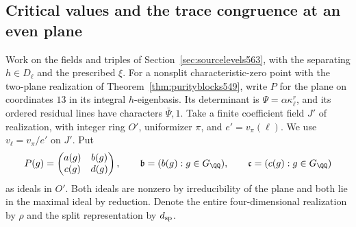 \documentclass[a4paper,11pt]{article}
\theoremstyle{definition}
\theoremstyle{remark}
\numberwithin{equation}{section}
\begin{document}
\subsection{Critical values and the trace congruence at an even plane}
\label{sec:planecongruence566}

Work on the fields and triples of Section~\ref{sec:sourcelevels563},
with the separating \(h\in D_\ell\) and the prescribed \(\xi\).
For a nonsplit characteristic-zero point with the two-plane
realization of Theorem~\ref{thm:purityblocks549}, write \(P\)
for the plane on coordinates \(13\) in its integral \(h\)-eigenbasis.
Its determinant is \(\Psi=\alpha\kappa_\ell^r\), and its ordered
residual lines have characters \(\bar\Psi,1\). Take a finite
coefficient field \(J'\) of realization, with integer ring \(O'\),
uniformizer \(\pi\), and \(e'=v_\pi(\ell)\). We use
\(v_\ell=v_\pi/e'\) on \(J'\). Put
\[
 P(g)=\begin{pmatrix}a(g)&b(g)\\c(g)&d(g)\end{pmatrix},
 \qquad
 \mathfrak b=(b(g):g\in G_\QQ),\qquad
 \mathfrak c=(c(g):g\in G_\QQ)
\]
as ideals in \(O'\). Both ideals are nonzero by irreducibility
of the plane and both lie in the maximal ideal by reduction.
Denote the entire four-dimensional realization by \(\rho\)
and the split representation by \(d_{\rm sp}\).
\end{document}
